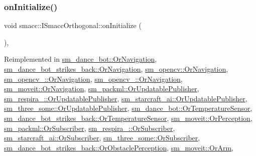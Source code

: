 \subsubsection{\texorpdfstring{on\+Initialize()}{onInitialize()}}
{\footnotesize\ttfamily void smacc\+::\+I\+Smacc\+Orthogonal\+::on\+Initialize (\begin{DoxyParamCaption}{ }\end{DoxyParamCaption})\hspace{0.3cm}{\ttfamily [protected]}, {\ttfamily [virtual]}}



Reimplemented in \hyperlink{classsm__dance__bot_1_1OrNavigation_a9f87c78f5af67024c9eda25097a135ac}{sm\+\_\+dance\+\_\+bot\+::\+Or\+Navigation}, \hyperlink{classsm__dance__bot__strikes__back_1_1OrNavigation_a458a0c5fed04b9906c6943f1e7ac5bf0}{sm\+\_\+dance\+\_\+bot\+\_\+strikes\+\_\+back\+::\+Or\+Navigation}, \hyperlink{classsm__opencv_1_1OrNavigation_a62f5ac68bfa502e92cf1fe1e3ca31781}{sm\+\_\+opencv\+::\+Or\+Navigation}, \hyperlink{classsm__opencv__2_1_1OrNavigation_a57483274c7e02b66cc528b910108efe5}{sm\+\_\+opencv\+\_\+::\+Or\+Navigation}, \hyperlink{classsm__opencv__3_1_1OrNavigation_ac79a0995fbb57ac65d1658e4a3b5e882}{sm\+\_\+opencv\+\_\+::\+Or\+Navigation}, \hyperlink{classsm__moveit_1_1OrNavigation_a242ad8c4d031d2fae3343e8a46bfec57}{sm\+\_\+moveit\+::\+Or\+Navigation}, \hyperlink{classsm__packml_1_1OrUpdatablePublisher_a1689f8aac565881e3f65246b6d6ce6a2}{sm\+\_\+packml\+::\+Or\+Updatable\+Publisher}, \hyperlink{classsm__respira__1_1_1OrUpdatablePublisher_a0ae110d830e583571fc79b4daa9d424d}{sm\+\_\+respira\+\_\+::\+Or\+Updatable\+Publisher}, \hyperlink{classsm__starcraft__ai_1_1OrUpdatablePublisher_a349747bdf330b39d76871cd49d36d0eb}{sm\+\_\+starcraft\+\_\+ai\+::\+Or\+Updatable\+Publisher}, \hyperlink{classsm__three__some_1_1OrUpdatablePublisher_aecda3521d565c139c75080f12e7045e0}{sm\+\_\+three\+\_\+some\+::\+Or\+Updatable\+Publisher}, \hyperlink{classsm__dance__bot_1_1OrTemperatureSensor_a2e944e459a695774dcf7fdbd5ac93b01}{sm\+\_\+dance\+\_\+bot\+::\+Or\+Temperature\+Sensor}, \hyperlink{classsm__dance__bot__strikes__back_1_1OrTemperatureSensor_a5ad96122dd84bf27e0a1f5c7c87be7e2}{sm\+\_\+dance\+\_\+bot\+\_\+strikes\+\_\+back\+::\+Or\+Temperature\+Sensor}, \hyperlink{classsm__moveit_1_1OrPerception_af5721051a0575a4a1f3d50aef7f2bdba}{sm\+\_\+moveit\+::\+Or\+Perception}, \hyperlink{classsm__packml_1_1OrSubscriber_a21c2958e73930f7260832656f664a769}{sm\+\_\+packml\+::\+Or\+Subscriber}, \hyperlink{classsm__respira__1_1_1OrSubscriber_a085137f52045333e18eea320e52dc1f1}{sm\+\_\+respira\+\_\+::\+Or\+Subscriber}, \hyperlink{classsm__starcraft__ai_1_1OrSubscriber_a6c50b70cd03e31c6c87a80eca9510c05}{sm\+\_\+starcraft\+\_\+ai\+::\+Or\+Subscriber}, \hyperlink{classsm__three__some_1_1OrSubscriber_af1362388fc43c43a38d75542931e348a}{sm\+\_\+three\+\_\+some\+::\+Or\+Subscriber}, \hyperlink{classsm__dance__bot__strikes__back_1_1OrObstaclePerception_a11bcaa362ceecfbd5b26562e4b380c3c}{sm\+\_\+dance\+\_\+bot\+\_\+strikes\+\_\+back\+::\+Or\+Obstacle\+Perception}, \hyperlink{classsm__moveit_1_1OrArm_a995fc310fe7cacbf78f45d98d1d96627}{sm\+\_\+moveit\+::\+Or\+Arm}, 